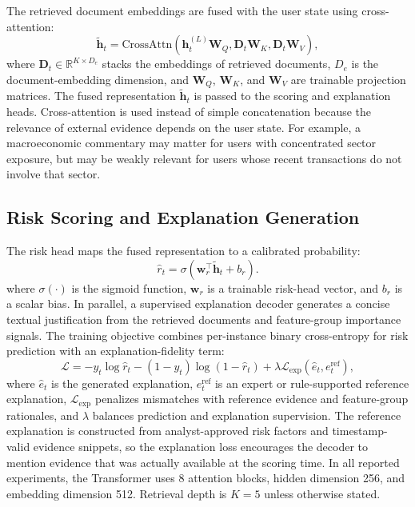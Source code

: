 \documentclass[runningheads]{llncs}
\begin{document}
The retrieved document embeddings are fused with the user state using cross-attention:
\begin{equation}
\tilde{\mathbf{h}}_t =
\mathrm{CrossAttn}
\left(
\mathbf{h}_t^{(L)}\mathbf{W}_Q,
\mathbf{D}_t\mathbf{W}_K,
\mathbf{D}_t\mathbf{W}_V
\right),
\label{eq:cross_attention}
\end{equation}
where $\mathbf{D}_t \in \mathbb{R}^{K \times D_e}$ stacks the embeddings of retrieved documents, $D_e$ is the document-embedding dimension, and $\mathbf{W}_Q$, $\mathbf{W}_K$, and $\mathbf{W}_V$ are trainable projection matrices. The fused representation $\tilde{\mathbf{h}}_t$ is passed to the scoring and explanation heads. Cross-attention is used instead of simple concatenation because the relevance of external evidence depends on the user state. For example, a macroeconomic commentary may matter for users with concentrated sector exposure, but may be weakly relevant for users whose recent transactions do not involve that sector.

\subsection{Risk Scoring and Explanation Generation}
The risk head maps the fused representation to a calibrated probability:
\begin{equation}
\hat{r}_t = \sigma(\mathbf{w}_r^\top \tilde{\mathbf{h}}_t + b_r).
\label{eq:risk_score}
\end{equation}
where $\sigma(\cdot)$ is the sigmoid function, $\mathbf{w}_r$ is a trainable risk-head vector, and $b_r$ is a scalar bias. In parallel, a supervised explanation decoder generates a concise textual justification from the retrieved documents and feature-group importance signals. The training objective combines per-instance binary cross-entropy for risk prediction with an explanation-fidelity term:
\begin{equation}
\mathcal{L} =
-y_t \log \hat{r}_t - (1-y_t)\log(1-\hat{r}_t)
+ \lambda \mathcal{L}_{\mathrm{exp}}(\hat{e}_t, e_t^{\mathrm{ref}}),
\label{eq:loss}
\end{equation}
where $\hat{e}_t$ is the generated explanation, $e_t^{\mathrm{ref}}$ is an expert or rule-supported reference explanation, $\mathcal{L}_{\mathrm{exp}}$ penalizes mismatches with reference evidence and feature-group rationales, and $\lambda$ balances prediction and explanation supervision. The reference explanation is constructed from analyst-approved risk factors and timestamp-valid evidence snippets, so the explanation loss encourages the decoder to mention evidence that was actually available at the scoring time. In all reported experiments, the Transformer uses 8 attention blocks, hidden dimension 256, and embedding dimension 512. Retrieval depth is $K=5$ unless otherwise stated.
\end{document}
